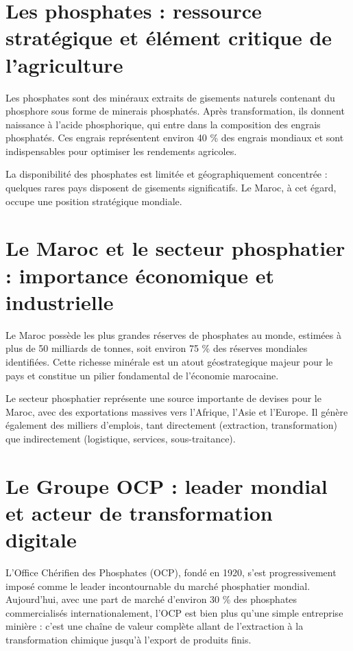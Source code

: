 \documentclass[a4paper,12pt,twoside]{report}
\begin{document}
\section*{Les phosphates : ressource stratégique et élément critique de l'agriculture}

Les phosphates sont des minéraux extraits de gisements naturels contenant du phosphore sous forme de minerais phosphatés. Après transformation, ils donnent naissance à l'acide phosphorique, qui entre dans la composition des engrais phosphatés. Ces engrais représentent environ 40 \% des engrais mondiaux et sont indispensables pour optimiser les rendements agricoles.

La disponibilité des phosphates est limitée et géographiquement concentrée : quelques rares pays disposent de gisements significatifs. Le Maroc, à cet égard, occupe une position stratégique mondiale.

\section*{Le Maroc et le secteur phosphatier : importance économique et industrielle}

Le Maroc possède les plus grandes réserves de phosphates au monde, estimées à plus de 50 milliards de tonnes, soit environ 75 \% des réserves mondiales identifiées. Cette richesse minérale est un atout géostrategique majeur pour le pays et constitue un pilier fondamental de l'économie marocaine.

Le secteur phosphatier représente une source importante de devises pour le Maroc, avec des exportations massives vers l'Afrique, l'Asie et l'Europe. Il génère également des milliers d'emplois, tant directement (extraction, transformation) que indirectement (logistique, services, sous-traitance).

\section*{Le Groupe OCP : leader mondial et acteur de transformation digitale}

L'Office Chérifien des Phosphates (OCP), fondé en 1920, s'est progressivement imposé comme le leader incontournable du marché phosphatier mondial. Aujourd'hui, avec une part de marché d'environ 30 \% des phosphates commercialisés internationalement, l'OCP est bien plus qu'une simple entreprise minière : c'est une chaîne de valeur complète allant de l'extraction à la transformation chimique jusqu'à l'export de produits finis.
\end{document}
